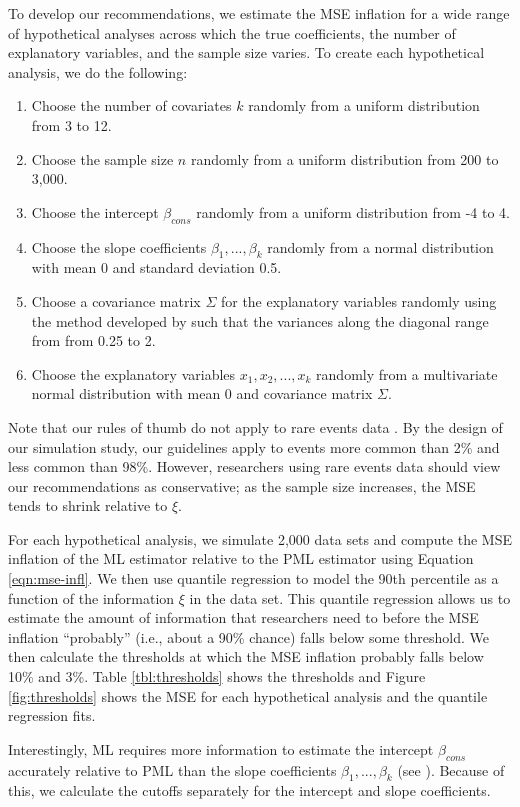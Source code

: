 \documentclass[12pt]{article}
\begin{document}
To develop our recommendations, we estimate the MSE inflation for a wide range of hypothetical analyses across which the true coefficients, the number of explanatory variables, and the sample size varies. 
To create each hypothetical analysis, we do the following:
\begin{enumerate}
\item Choose the number of covariates $k$ randomly from a uniform distribution from 3 to 12.
\item Choose the sample size $n$ randomly from a uniform distribution from 200 to 3,000.
\item Choose the intercept $\beta_{cons}$ randomly from a uniform distribution from -4 to 4.
\item Choose the slope coefficients $\beta_1,...,\beta_k$ randomly from a normal distribution with mean 0 and standard deviation 0.5.
\item Choose a covariance matrix $\Sigma$ for the explanatory variables randomly using the method developed by \cite{Joe2006} such that the variances along the diagonal range from from 0.25 to 2.
\item Choose the explanatory variables $x_1, x_2,...,x_k$ randomly from a multivariate normal distribution with mean 0 and covariance matrix $\Sigma$. 
\end{enumerate}
Note that our rules of thumb do not apply to rare events data \citep{KingZeng2001}.
By the design of our simulation study, our guidelines apply to events more common than 2\% and less common than 98\%.
However, researchers using rare events data should view our recommendations as conservative; as the sample size increases, the MSE tends to shrink relative to $\xi$. 

For each hypothetical analysis, we simulate 2,000 data sets and compute the MSE inflation of the ML estimator relative to the PML estimator using Equation \ref{eqn:mse-infl}.
We then use quantile regression to model the 90th percentile as a function of the information $\xi$ in the data set.
This quantile regression allows us to estimate the amount of information that researchers need to before the MSE inflation ``probably'' (i.e., about a 90\% chance) falls below some threshold.
We then calculate the thresholds at which the MSE inflation probably falls below 10\% and 3\%. Table \ref{tbl:thresholds} shows the thresholds and Figure \ref{fig:thresholds} shows the MSE for each hypothetical analysis and the quantile regression fits.

Interestingly, ML requires more information to estimate the intercept $\beta_{cons}$ accurately relative to PML than the slope coefficients $\beta_1,..., \beta_k$ (see \citealt{KingZeng2001}).
Because of this, we calculate the cutoffs separately for the intercept and slope coefficients.
\end{document}
